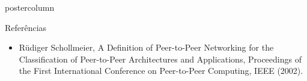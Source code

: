 \documentclass[final]{beamer}
\begin{document}
\begin{frame}
\begin{columns}
\begin{column}{.5\textwidth}
\begin{beamercolorbox}[center,wd=\textwidth]{postercolumn}
\begin{minipage}[T]{.95\textwidth}
{            \begin{block}{Referências}
              \small
                \begin{itemize}
                    \item Rüdiger Schollmeier, A Definition of Peer-to-Peer Networking for the Classification of Peer-to-Peer Architectures and Applications, Proceedings of the First International Conference on Peer-to-Peer Computing, IEEE (2002).
                \end{itemize}
                \vspace*{0.2cm} 
            \end{block}
            \vfill
          }
        \end{minipage}
      \end{beamercolorbox}
    \end{column}


  \end{columns}
\end{frame}
\end{document}
